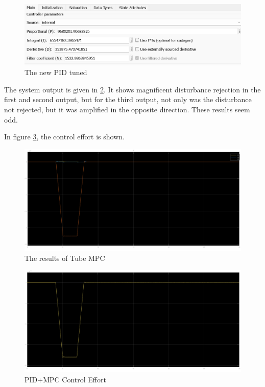 \documentclass{article}
\begin{document}
\begin{figure}
    \centering
    \includegraphics[width=\linewidth]{images/New_PID_Configuration.png}
    \caption{The new PID tuned}
    \label{fig:PID_Tube}
\end{figure}

The system output is given in \ref{fig:Tube:Result}. It shows magnificent disturbance rejection in the first and second output, but for the third output, not only was the disturbance not rejected, but it was amplified in the opposite direction. These results seem odd.

In figure \ref{fig:PID+MPC}, the control effort is shown.

\begin{figure}
    \centering
    \includegraphics[width=\linewidth]{images/TUBE_MPC_RESULTS.png}
    \caption{The results of Tube MPC}
    \label{fig:Tube:Result}
\end{figure}

\begin{figure}
    \centering
    \includegraphics[width=\linewidth]{images/PID+MPC_Control_Output.png}
    \caption{PID+MPC Control Effort}
    \label{fig:PID+MPC}
\end{figure}
\end{document}
